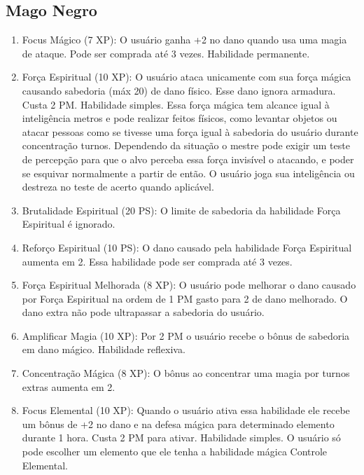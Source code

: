  \subsection{Mago Negro}
 
 
\begin{enumerate}

	\item Focus Mágico (7 XP): O usuário ganha +2 no dano quando usa uma magia de ataque. Pode ser comprada até 3 vezes. Habilidade permanente.

 	\item Força Espiritual (10 XP): O usuário ataca unicamente com sua força mágica causando sabedoria (máx 20) de dano físico. Esse dano ignora armadura. Custa 2 PM. Habilidade simples. Essa força mágica tem alcance igual à inteligência metros e pode realizar feitos físicos, como levantar objetos ou atacar pessoas como se tivesse uma força igual à sabedoria do usuário durante concentração turnos. Dependendo da situação o mestre pode exigir um teste de percepção para que o alvo perceba essa força invisível o atacando, e poder se esquivar normalmente a partir de então. O usuário joga sua inteligência ou destreza no teste de acerto quando aplicável.

 	\item Brutalidade Espiritual (20 PS): O limite de sabedoria da habilidade Força Espiritual é ignorado.
 	
	 	
 	\item Reforço Espiritual (10 PS): O dano causado pela habilidade Força Espiritual aumenta em 2. Essa habilidade pode ser comprada até 3 vezes.
 	
 	\item Força Espiritual Melhorada (8 XP): O usuário pode melhorar o dano causado por Força Espiritual na ordem de 1 PM gasto para 2 de dano melhorado. O dano extra não pode ultrapassar a sabedoria do usuário.
 
 	\item Amplificar Magia (10 XP): Por 2 PM o usuário recebe o bônus de sabedoria em dano mágico. Habilidade reflexiva.
 	
 	\item Concentração Mágica (8 XP): O bônus ao concentrar uma magia por turnos extras aumenta em 2.
 	
 	\item Focus Elemental (10 XP): Quando o usuário ativa essa habilidade ele recebe um bônus de +2 no dano e na defesa mágica para determinado elemento durante 1 hora. Custa 2 PM para ativar. Habilidade simples. O usuário só pode escolher um elemento que ele tenha a habilidade mágica Controle Elemental.
 	

\end{enumerate}
